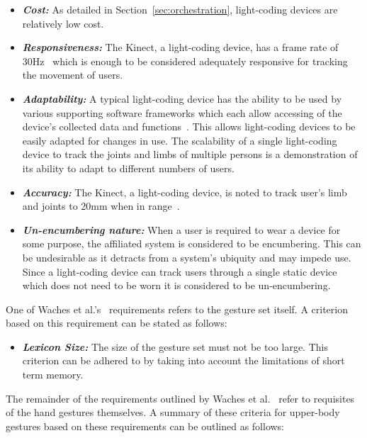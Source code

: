 \documentclass[link]{IWCOMP}
\begin{document}
\begin{itemize}
\item  \textit{\textbf{Cost:}} As detailed in Section~\ref{sec:orchestration}, light-coding devices are relatively low cost.
\item \textit{\textbf{Responsiveness:}} The Kinect, a light-coding device, has a frame rate of 30Hz~\cite{Livingston2012} which is enough to be considered adequately responsive for tracking the movement of users.
\item \textit{\textbf{Adaptability:}} A typical light-coding device has the ability to be used by various supporting software frameworks which each allow accessing of the device's collected data and functions~\cite{Goth2011}.
This allows light-coding devices to be easily adapted for changes in use.
The scalability of a single light-coding device to track the joints and limbs of multiple persons is a demonstration of its ability to adapt to different numbers of users.
\item \textit{\textbf{Accuracy:}} The Kinect, a light-coding device, is noted to track user's limb and joints to 20mm when in range~\cite{Marquardt2011}.
\item \textit{\textbf{Un-encumbering nature:}} When a user is required to wear a device for some purpose, the affiliated system is considered to be encumbering.
This can be undesirable as it detracts from a system's ubiquity and may impede use. 
Since a light-coding device can track users through a single static device which does not need to be worn it is considered to be un-encumbering.\\ 
\end{itemize}

One of Waches et al.'s~\citeyearpar{Wachs2011} requirements refers to the gesture set itself.
A criterion based on this requirement can be stated as follows:

\begin{itemize}
\item \textit{\textbf{Lexicon Size:}} The size of the gesture set must not be too large.
This criterion can be adhered to by taking into account the limitations of short term memory.\\ 
\end{itemize}

The remainder of the requirements outlined by Waches et al.~\citeyearpar{Wachs2011} refer to requisites of the hand gestures themselves.
A summary of these criteria for upper-body gestures based on these requirements can be outlined as follows:
\end{document}

